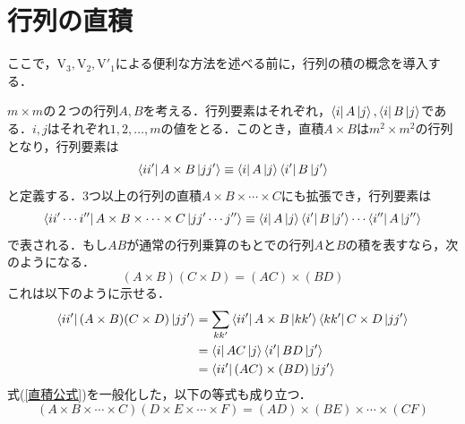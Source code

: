 \documentclass[a4paper,11pt]{jsreport}
\begin{document}
\section{行列の直積}
ここで，$\mathrm{V}_3, \mathrm{V}_2, \mathrm{V}'_1$による便利な方法を述べる前に，行列の積の概念を導入する．\par
$m \times m$の２つの行列$A, B$を考える．行列要素はそれぞれ，$\bra{i}A\ket{j}, \bra{i}B\ket{j}$である．$i, j$はそれぞれ$1, 2, \dots, m$の値をとる．このとき，直積$A \times B$は$m^2 \times m^2$の行列となり，行列要素は
\begin{equation}
  \bra{ii'}A \times B\ket{jj'}
  \equiv \bra{i} A \ket{j} \bra{i'} B \ket{j'}
\end{equation}
と定義する．3つ以上の行列の直積$A \times B \times \cdots \times C$にも拡張でき，行列要素は
\begin{equation}
  \bra{ii' \cdots i''} A \times B \times \cdots \times C \ket{jj' \cdots j''}
  \equiv \bra{i}A\ket{j} \bra{i'}B\ket{j'} \cdots \bra{i''}A\ket{j''}
\end{equation}
で表される．もし$AB$が通常の行列乗算のもとでの行列$A$と$B$の積を表すなら，次のようになる．
\begin{equation}
  (A \times B)(C \times D) = (AC) \times (BD)
  \label{直積公式}
\end{equation}
これは以下のように示せる．
\begin{align*}
  \bra{ii'} (A \times B)(C \times D) \ket{jj'}
   & = \sum_{kk'} \bra{ii'} A \times B \ket{kk'} \bra{kk'} C \times D \ket{jj'} \\
   & = \bra{i} AC \ket{j} \bra{i'} BD \ket{j'}                                  \\
   & = \bra{ii'} (AC) \times (BD) \ket{jj'}
\end{align*}
式(\ref{直積公式})を一般化した，以下の等式も成り立つ．
\begin{equation}
  (A \times B \times \cdots \times C) (D \times E \times \cdots \times F)
  = (AD) \times (BE) \times \cdots \times (CF)
\end{equation}
\end{document}
